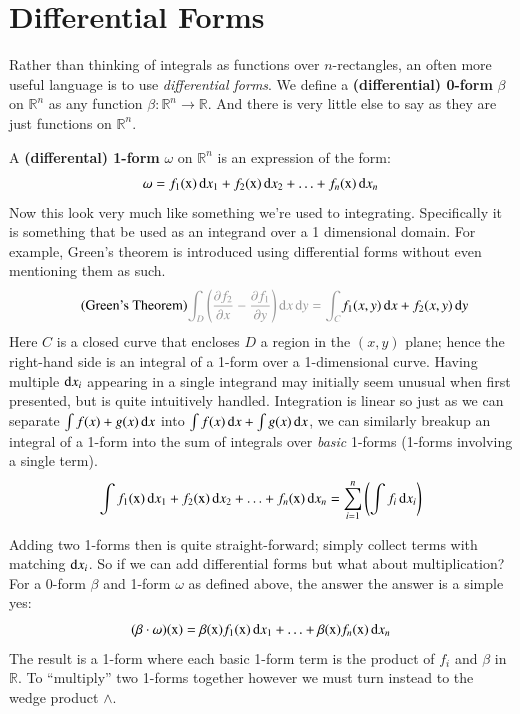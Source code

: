 
\section{Differential Forms}

Rather than thinking of integrals as functions over $n$-rectangles, an often more useful language is to use 
\emph{differential forms}.
We define a \textbf{(differential) 0-form} $\beta$ on $\mathbb{R}^n$ as any function 
$\beta : \mathbb{R}^n \to \mathbb{R}$.
And there is very little else to say as they are just functions on $\mathbb{R}^n$.



A \textbf{(differental) 1-form} $\omega$ on $\mathbb{R}^n$ is an expression of the form:
\begin{equation*}
	\omega = f_1(\text{x}) \mathop{}\!\mathrm{d} x_1 + f_2(\text{x}) \mathop{}\!\mathrm{d} x_2 + \ldots + f_n(\text{x}) \mathop{}\!\mathrm{d} x_n
\end{equation*}
Now this look very much like something we're used to integrating.
Specifically it is something that be used as an integrand over a 1 dimensional domain.
For example, Green's theorem is introduced using differential forms without even mentioning them as such.
\begin{equation}
	\tag{Green's Theorem}
	\textcolor{black!40}{
		\int_D \left( \frac{\partial f_2}{\partial x} - \frac{\partial f_1}{\partial y}  \right) \diff x \diff y 
		=\int_{C}
	} f_1(x,y) \diff x + f_2(x,y) \diff y
\end{equation}
Here $C$ is a closed curve that encloses $D$ a region in the $(x,y)$ plane; hence the right-hand side is an integral of
a 1-form over a 1-dimensional curve.
Having multiple $\mathop{}\!\mathrm{d} x_i$ appearing in a single integrand may initially seem unusual when first presented, 
but is quite intuitively handled.
Integration is linear so just as we can separate $\int f(x) + g(x) \mathop{}\!\mathrm{d} x$ into $\int f(x) \mathop{}\!\mathrm{d} x + \int g(x) \mathop{}\!\mathrm{d} x$, 
we can similarly breakup an integral of a 1-form into the sum of integrals over \emph{basic} 1-forms 
(1-forms involving a single term).
\begin{equation*}
	\int f_1(\text{x}) \mathop{}\!\mathrm{d} x_1 
		+ f_2(\text{x}) \mathop{}\!\mathrm{d} x_2 
		+ \ldots 
		+ f_n(\text{x}) \mathop{}\!\mathrm{d} x_n
	=	\sum_{i=1}^n \left( \int f_i \mathop{}\!\mathrm{d} x_i \right)
\end{equation*}


Adding two 1-forms then is quite straight-forward; simply collect terms with matching $\mathop{}\!\mathrm{d} x_i$.
So if we can add differential forms but what about multiplication?
For a 0-form $\beta$ and 1-form $\omega$ as defined above, the answer the answer is a simple yes:
\begin{equation*}
	(\beta \cdot \omega)(\text{x}) 
		= \beta(\text{x})f_1(\text{x}) \mathop{}\!\mathrm{d} x_1 
		+ \ldots  
		+ \beta(\text{x})f_n(\text{x}) \mathop{}\!\mathrm{d} x_n
\end{equation*}
The result is a 1-form where each basic 1-form term is the product of $f_i$ and $\beta$ in $\mathbb{R}$.
To ``multiply'' two 1-forms together however we must turn instead to the wedge product $\wedge$.

